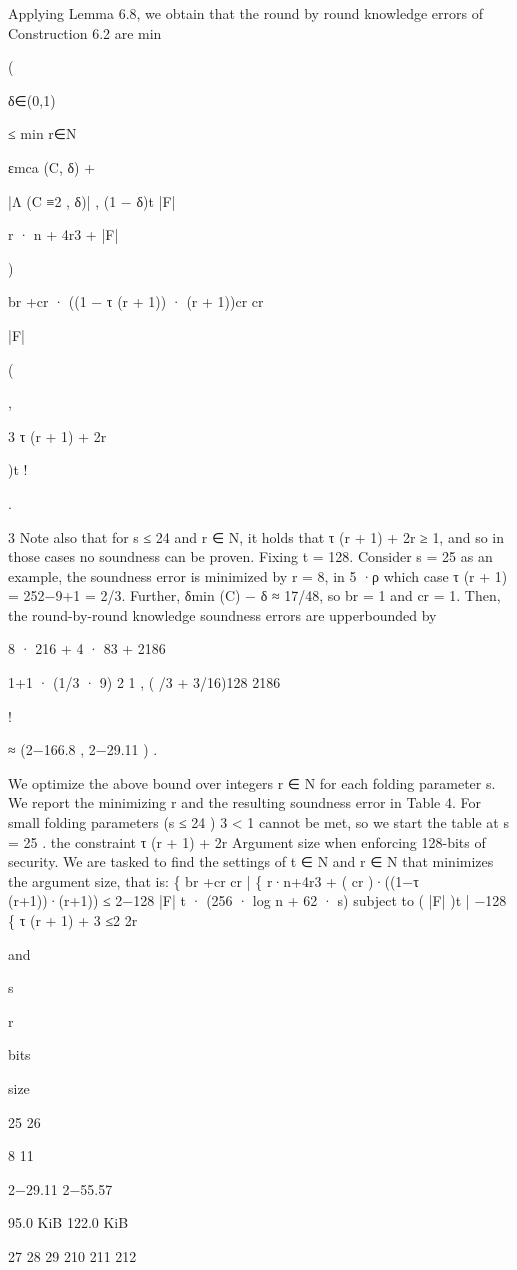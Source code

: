 \documentclass[11pt]{article}
\begin{document}
Applying Lemma 6.8, we obtain that the round by round knowledge errors of Construction 6.2 are
min

(

δ∈(0,1)

≤ min
r∈N

εmca (C, δ) +

|Λ (C ≡2 , δ)|
, (1 − δ)t
|F|

r · n + 4r3
+
|F|

)

br +cr 
· ((1 − τ (r + 1)) · (r + 1))cr
cr

|F|

(

,

3
τ (r + 1) +
2r

)t !

.

3
Note also that for s ≤ 24 and r ∈ N, it holds that τ (r + 1) + 2r
≥ 1, and so in those cases no
soundness can be proven.
Fixing t = 128. Consider s = 25 as an example, the soundness error is minimized by r = 8, in
5 ·ρ
which case τ (r + 1) = 252−9+1
= 2/3. Further, δmin (C) − δ ≈ 17/48, so br = 1 and cr = 1. Then, the
round-by-round knowledge soundness errors are upperbounded by

8 · 216 + 4 · 83
+
2186

1+1
· (1/3 · 9) 2
1
, ( /3 + 3/16)128
2186

!

≈ (2−166.8 , 2−29.11 ) .

We optimize the above bound over integers r ∈ N for each folding parameter s. We report the
minimizing r and the resulting soundness error in Table 4. For small folding parameters (s ≤ 24 )
3
< 1 cannot be met, so we start the table at s = 25 .
the constraint τ (r + 1) + 2r
Argument size when enforcing 128-bits of security. We are tasked to find the settings of
t ∈ N and r ∈ N that minimizes the argument size, that is:
\{
br +cr
cr
|
\{ r·n+4r3 + ( cr )·((1−τ (r+1))·(r+1)) ≤ 2−128
|F|
t · (256 · log n + 62 · s) subject to ( |F|
)t
|
−128
\{ τ (r + 1) + 3
≤2
2r


and

s

r

bits

size

25
26

8
11

2−29.11
2−55.57

95.0 KiB
122.0 KiB

27
28
29
210
211
212
\end{document}
